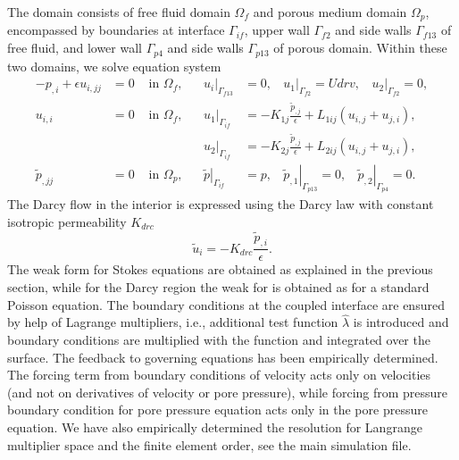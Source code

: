 \documentclass[12pt,a4paper]{article}
\newcommand{\ord}{\epsilon}
\begin{document}
The domain consists of free fluid domain $\Omega_f$ and porous medium domain $\Omega_p$, encompassed by boundaries at interface $\Gamma_{if}$, upper wall $\Gamma_{f2}$ and side walls $\Gamma_{f13}$ of free fluid, and lower wall $\Gamma_{p4}$ and side walls $\Gamma_{p13}$ of porous domain. Within these two domains, we solve equation system
\begin{align}
- p_{,i} + \ord u_{i,jj} & = 0 & \mbox{ in } \Omega_f, & & \left. u_i \right|_{\Gamma_{f13}} & = 0, \ \ \ \ \left. u_1 \right|_{\Gamma_{f2}} = Udrv, \ \ \ \ \left. u_2 \right|_{\Gamma_{f2}} = 0, \\
u_{i,i} & = 0 & \mbox{ in } \Omega_f, & & \left. u_1 \right|_{\Gamma_{if}} & = - K_{1j} \frac{\tilde{p}_{,j}}{\ord} + L_{1ij} \left( u_{i,j} + u_{j,i} \right), \\
& & & & \left. u_2 \right|_{\Gamma_{if}} & = - K_{2j} \frac{\tilde{p}_{,j}}{\ord} + L_{2ij} \left( u_{i,j} + u_{j,i} \right), \\
\tilde{p}_{,jj} & = 0 & \mbox{ in } \Omega_p, & & \left. \tilde{p} \right|_{\Gamma_{if}} & = p, \ \ \ \ \left. \tilde{p}_{,1} \right|_{\Gamma_{p13}} = 0, \ \ \ \ \left. \tilde{p}_{,2} \right|_{\Gamma_{p4}} = 0.
\end{align}
The Darcy flow in the interior is expressed using the Darcy law with constant isotropic permeability $K_{drc}$
\begin{equation}
\tilde{u}_i = - K_{drc} \frac{\tilde{p}_{,i}}{\ord} .
\end{equation}
The weak form for Stokes equations are obtained as explained in the
previous section, while for the Darcy region the weak for is obtained
as for a standard Poisson equation. The boundary conditions at the
coupled interface are ensured by help of Lagrange multipliers, i.e.,
additional test function $\hat{\lambda}$ is introduced and
boundary conditions are multiplied with the function and integrated
over the surface. The feedback to governing equations has been empirically
determined. The forcing term from boundary conditions of velocity acts
only on velocities (and not on derivatives
of velocity or pore pressure), while forcing from pressure boundary
condition for pore
pressure equation acts only in the pore pressure equation.
We have also empirically determined the resolution for Langrange multiplier
space and the finite element order, see the main simulation file.
\end{document}
